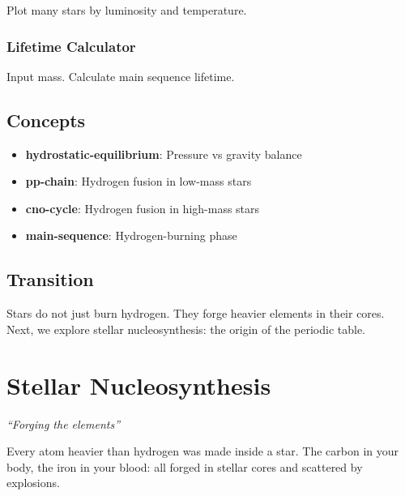 \documentclass[
  11pt,
  letterpaper,
  twoside,
  openright]{book}
\providecommand{\tightlist}{%
  \setlength{\itemsep}{0pt}\setlength{\parskip}{0pt}}
\begin{document}
Plot many stars by luminosity and temperature.

\subsection{Lifetime Calculator}\label{lifetime-calculator}

Input mass. Calculate main sequence lifetime.

\section{Concepts}\label{concepts-20}

\begin{itemize}
\tightlist
\item
  \textbf{hydrostatic-equilibrium}: Pressure vs gravity balance
\item
  \textbf{pp-chain}: Hydrogen fusion in low-mass stars
\item
  \textbf{cno-cycle}: Hydrogen fusion in high-mass stars
\item
  \textbf{main-sequence}: Hydrogen-burning phase
\end{itemize}

\section{Transition}\label{transition-20}

Stars do not just burn hydrogen. They forge heavier elements in their
cores. Next, we explore stellar nucleosynthesis: the origin of the
periodic table.

\chapter{Stellar Nucleosynthesis}\label{sec-stellar-nucleosynthesis}

\emph{``Forging the elements''}

\begin{tcolorbox}[enhanced jigsaw, leftrule=.75mm, title=\textcolor{quarto-callout-note-color}{\faInfo}\hspace{0.5em}{Key Revelation}, bottomrule=.15mm, opacityback=0, coltitle=black, arc=.35mm, colframe=quarto-callout-note-color-frame, colbacktitle=quarto-callout-note-color!10!white, colback=white, titlerule=0mm, breakable, bottomtitle=1mm, toptitle=1mm, rightrule=.15mm, toprule=.15mm, left=2mm, opacitybacktitle=0.6]

Every atom heavier than hydrogen was made inside a star. The carbon in
your body, the iron in your blood: all forged in stellar cores and
scattered by explosions.

\end{tcolorbox}
\end{document}
